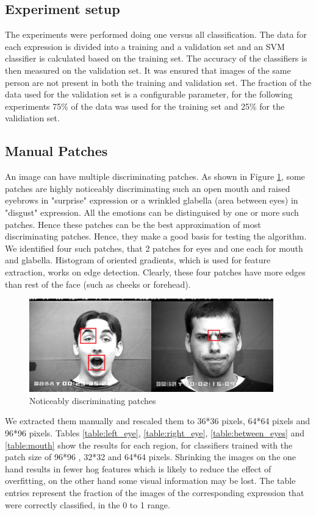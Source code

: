 \subsection{Experiment setup}
The experiments were performed doing one versus all classification. The data for each expression is divided into a training and a validation set and an SVM
classifier is calculated based on the training set. The accuracy of the classifiers is then measured on the validation set. It was ensured that images of the same
person are not present in both the training and validation set. The fraction of the data used for the validation set is a configurable parameter, for the 
following experiments 75\% of the data was used for the training set and 25\% for the validiation set. 

\subsection{Manual Patches}

An image can have multiple discriminating patches. As shown in Figure \ref{fig:manual_patch}, some patches are highly noticeably discriminating such an open mouth and raised eyebrows in "surprise" expression or a wrinkled glabella (area between eyes) in "disgust" expression. All the emotions can be distinguised by one or more such patches. Hence these patches can be the best approximation of most discriminating patches. Hence, they make a good basis for testing the algorithm.  We identified four such patches, that 2 patches for eyes and one each for mouth and glabella.  Histogram of oriented gradients, which is used for feature extraction, works on edge detection. Clearly, these four patches have more edges than rest of the face (such as cheeks or forehead).

\begin{figure}
\centering
\includegraphics[width=300pt]{manual_patch.png}
  \caption{Noticeably discriminating patches}
  \label{fig:manual_patch}
\end{figure}

We extracted them manually and rescaled them to 36*36 pixels, 64*64 pixels and 96*96 pixels. Tables \ref{table:left_eye}, \ref{table:right_eye}, \ref{table:between_eyes} and \ref{table:mouth} show the results for each region, for classifiers trained  with the  patch size of 96*96 , 32*32 and 64*64 pixels. Shrinking the images on the one hand results in fewer hog features which is likely to reduce the effect of overfitting, on the other hand some visual information may be lost. The table entries represent the fraction of the images of the corresponding expression that were correctly classified, in the 0 to 1 range.

